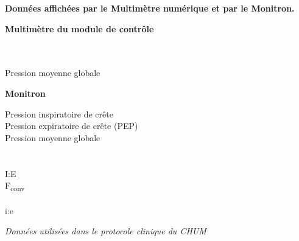\def\ptitle#1{\vspace{.4\baselineskip}\textbf{#1}\par\vspace{0.4\baselineskip}}

\begin{framed}
	\ptitle{Données affichées par le Multimètre numérique et par le Monitron. }
	\ptitle{Multimètre du module de contrôle }
	\\
	\\
	Pression moyenne globale\\

	\ptitle{Monitron}
	\raggedright
	Pression inspiratoire de crête\\
	Pression expiratoire de crête (PEP)\\
	Pression moyenne globale\\
	\\
	\\
	I:E\\
	F\textsubscript{conv}\\
	\\
	i:e

	\vspace{0.2\baselineskip}
	{\small *\protochum{}\space \emph{Données utilisées dans le
	protocole clinique du CHUM}}
	\end{framed}
